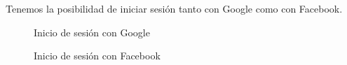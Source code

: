 Tenemos la posibilidad de iniciar sesión tanto con Google como con Facebook.

\begin{figure}[H]
\begin{center}
\caption{Inicio de sesión con Google\label{fig:google}}
\end{center}
\end{figure}

\begin{figure}[H]
\begin{center}
\caption{Inicio de sesión con Facebook\label{fig:facebook}}
\end{center}
\end{figure}

